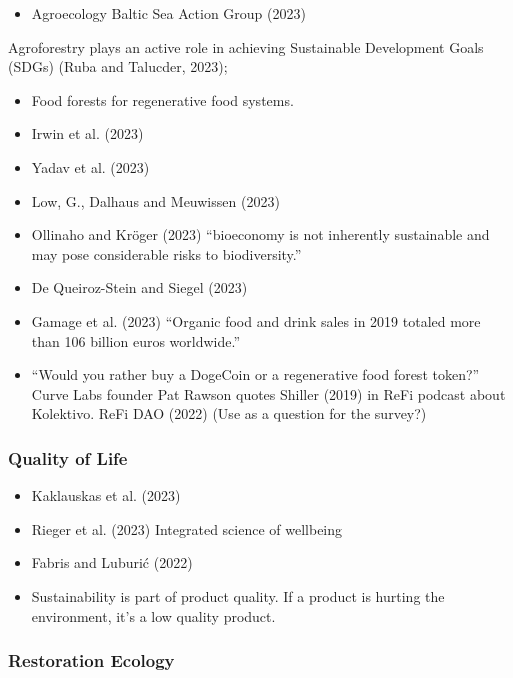 \documentclass[
  letterpaper,
  DIV=11,
  numbers=noendperiod]{scrartcl}
\providecommand{\tightlist}{%
  \setlength{\itemsep}{0pt}\setlength{\parskip}{0pt}}\usepackage{longtable,booktabs,array}
\begin{document}
\begin{itemize}
\tightlist
\item
  Agroecology Baltic Sea Action Group (2023)
\end{itemize}

Agroforestry plays an active role in achieving Sustainable Development
Goals (SDGs) (Ruba and Talucder, 2023);

\begin{itemize}
\item
  Food forests for regenerative food systems.
\item
  Irwin et al. (2023)
\item
  Yadav et al. (2023)
\item
  Low, G., Dalhaus and Meuwissen (2023)
\item
  Ollinaho and Kröger (2023) ``bioeconomy is not inherently sustainable
  and may pose considerable risks to biodiversity.''
\item
  De Queiroz-Stein and Siegel (2023)
\item
  Gamage et al. (2023) ``Organic food and drink sales in 2019 totaled
  more than 106 billion euros worldwide.''
\item
  ``Would you rather buy a DogeCoin or a regenerative food forest
  token?'' Curve Labs founder Pat Rawson quotes Shiller (2019) in ReFi
  podcast about Kolektivo. ReFi DAO (2022) (Use as a question for the
  survey?)
\end{itemize}

\subsubsection{Quality of Life}\label{quality-of-life}

\begin{itemize}
\item
  Kaklauskas et al. (2023)
\item
  Rieger et al. (2023) Integrated science of wellbeing
\item
  Fabris and Luburić (2022)
\item
  Sustainability is part of product quality. If a product is hurting the
  environment, it's a low quality product.
\end{itemize}

\subsubsection{Restoration Ecology}\label{restoration-ecology}
\end{document}
